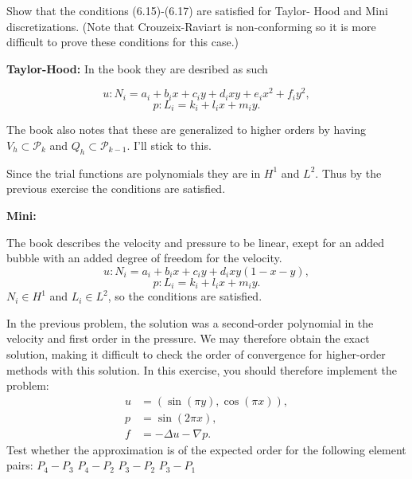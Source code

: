 \documentclass[a4paper,12pt]{article}
\theoremstyle{exerciseStyle}
\theoremstyle{solutionStyle}
\begin{document}
\begin{exercise}{6.2}
    Show that the conditions (6.15)-(6.17) are satisfied for Taylor-
    Hood and Mini discretizations. (Note that Crouzeix-Raviart is non-conforming
    so it is more difficult to prove these conditions for this case.)
\end{exercise}

\begin{solution}{6.2}


    \medskip\noindent\textbf{Taylor-Hood:}
    In the book they are desribed as such

    \[
        u : N_i = a_i + b_i x + c_i y + d_i xy + e_i x^2 + f_i y^2,
    \]
    \[
        p : L_i = k_i + l_i x + m_i y.
    \]

    The book also notes that these are generalized to higher orders by having
    \( V_h \subset \mathcal{P}_k\) and \( Q_h \subset \mathcal{P}_{k-1}\). I'll stick to this.

    Since the trial functions are polynomials they are in $H^1$ and $L^2$.
    Thus by the previous exercise the conditions are satisfied.


    \medskip\noindent\textbf{Mini:}

    The book describes the velocity and pressure to be linear, exept for an added bubble with an added degree of freedom for the velocity.
    \[
        u : N_i = a_i + b_i x + c_i y + d_i xy(1 - x - y) ,
    \]
    \[
        p : L_i = k_i + l_i x + m_i y.
    \]
    \noindent
    $N_i \in H^1$ and \( L_i \in L^2\), so the conditions are satisfied.

\end{solution}

\begin{exercise}{6.6}
    In the previous problem, the solution was a second-order polynomial in the velocity and first order in the pressure. We may therefore obtain the exact solution, making it difficult to check the order of convergence for higher-order methods with this solution. In this exercise, you should therefore implement the problem:
    \begin{align*}
        u & = (\sin(\pi y), \cos(\pi x)), \\
        p & = \sin(2\pi x),               \\
        f & = -\Delta u - \nabla p.
    \end{align*}
    Test whether the approximation is of the expected order for the following element pairs:
    $P_4 - P_3$
    $P_4 - P_2$
    $P_3 - P_2$
    $P_3 - P_1$

\end{exercise}
\end{document}

